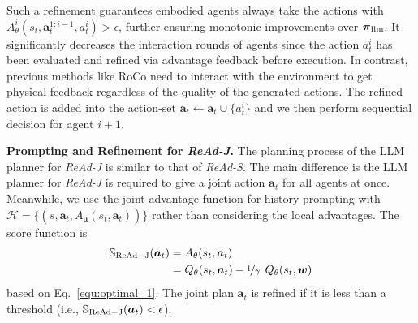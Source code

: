 \documentclass[11pt]{article}
\theoremstyle{plain}
\theoremstyle{remark}
\begin{document}
Such a refinement guarantees embodied agents always take the actions with $A_{\theta}^{i}(s_t, \boldsymbol{a}_t^{1:i-1}, a_{t}^{i}) > \epsilon$, further ensuring monotonic improvements over $\boldsymbol{\pi}_{\rm llm}$.
It significantly decreases the interaction rounds of agents since the action $a^i_t$ has been evaluated and refined via advantage feedback before execution. In contrast, previous methods like RoCo need to interact with the environment to get physical feedback regardless of the quality of the generated actions. The refined action is added into the action-set $\boldsymbol{a}_t \leftarrow \boldsymbol{a}_t \cup \{a_t^{i}\}$ and we then perform sequential decision for agent $i+1$.

\textbf{Prompting and Refinement for \emph{ReAd-J}.} The planning process of the LLM planner for \emph{ReAd-J} is similar to that of \emph{ReAd-S}. The main difference is the LLM planner for \emph{ReAd-J} is required to give a joint action $\boldsymbol{a}_t$ for all agents at once. Meanwhile, we use the joint advantage function for history prompting with $\mathcal{H}=\{(s,\boldsymbol{a}_t,A_{\boldsymbol{\mu}}(s_t,\boldsymbol{a}_t))\}$ rather than considering the local advantages. The score function is 
\begin{align*}
\mathbb{S}_{\rm ReAd-J}(\boldsymbol{a}_t) &= A_\theta(s_t, \boldsymbol{a}_t)\\
&= Q_\theta(s_t, \boldsymbol{a}_t) - \nicefrac{1}{\gamma} \:\:Q_\theta(s_t, \boldsymbol{w})
\end{align*}
based on Eq.~\eqref{equ:optimal_1}. The joint plan $\boldsymbol{a}_t$ is refined if it is less than a threshold (i.e., $\mathbb{S}_{\rm ReAd-J}(\boldsymbol{a}_t)<\epsilon$).

\end{document}
